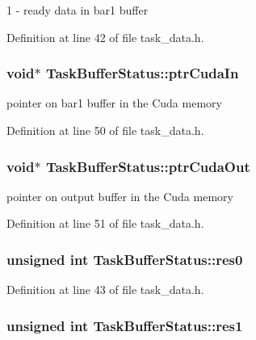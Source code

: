 1 -\/ ready data in bar1 buffer 

Definition at line 42 of file task\_\-data.h.\hypertarget{structTaskBufferStatus_a530d1c73d828ba73216ab03fa67be5d4}{
\subsubsection[{ptrCudaIn}]{\setlength{\rightskip}{0pt plus 5cm}void$\ast$ {\bf TaskBufferStatus::ptrCudaIn}}}
\label{structTaskBufferStatus_a530d1c73d828ba73216ab03fa67be5d4}


pointer on bar1 buffer in the Cuda memory 

Definition at line 50 of file task\_\-data.h.\hypertarget{structTaskBufferStatus_ac3996bd365a6296309bd372b227bbbdc}{
\subsubsection[{ptrCudaOut}]{\setlength{\rightskip}{0pt plus 5cm}void$\ast$ {\bf TaskBufferStatus::ptrCudaOut}}}
\label{structTaskBufferStatus_ac3996bd365a6296309bd372b227bbbdc}


pointer on output buffer in the Cuda memory 

Definition at line 51 of file task\_\-data.h.\hypertarget{structTaskBufferStatus_aac53804036a15457af35c1a4fa0595d2}{
\subsubsection[{res0}]{\setlength{\rightskip}{0pt plus 5cm}unsigned int {\bf TaskBufferStatus::res0}}}
\label{structTaskBufferStatus_aac53804036a15457af35c1a4fa0595d2}


Definition at line 43 of file task\_\-data.h.\hypertarget{structTaskBufferStatus_a488df55e08dfb02be4d793186efef2f0}{
\subsubsection[{res1}]{\setlength{\rightskip}{0pt plus 5cm}unsigned int {\bf TaskBufferStatus::res1}}}
\label{structTaskBufferStatus_a488df55e08dfb02be4d793186efef2f0}


